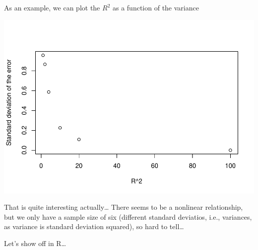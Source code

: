 \documentclass[
]{book}
\newenvironment{Shaded}{\begin{snugshade}}{\end{snugshade}}
\newcommand{\DecValTok}[1]{\textcolor[rgb]{0.00,0.00,0.81}{#1}}
\newcommand{\KeywordTok}[1]{\textcolor[rgb]{0.13,0.29,0.53}{\textbf{#1}}}
\newcommand{\NormalTok}[1]{#1}
\newcommand{\OperatorTok}[1]{\textcolor[rgb]{0.81,0.36,0.00}{\textbf{#1}}}
\begin{document}
As an example, we can plot the \(R^2\) as a function of the variance

\begin{Shaded}
\end{Shaded}

\includegraphics{ECOMODbook_files/figure-latex/a6.30-1.pdf}

That is quite interesting actually\ldots{} There seems to be a nonlinear relationship, but we only have a sample size of six (different standard deviatios, i.e., variances, as variance is standard deviation squared), so hard to tell\ldots{}

Let's show off in R\ldots{}
\end{document}
